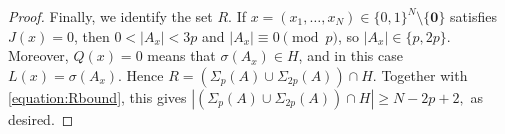 \documentclass[10pt,a4paper]{amsart}
\begin{document}
\begin{proof}
Finally, we identify the set $R$.  If
$x=(x_1,\ldots,x_N)\in\{0,1\}^N\setminus\{\mathbf 0\}$ satisfies $J(x)=0$, then
$0<|A_x|<3p$ and $|A_x|\equiv0\pmod p$, so
$|A_x|\in\{p,2p\}$. Moreover, $Q(x)=0$ means that
$\sigma(A_x)\in H$, and in this case
$L(x)=\sigma(A_x)$. Hence $R=
\left(\Sigma_p(A)\cup\Sigma_{2p}(A)\right)\cap H.$
Together with \eqref{equation:Rbound}, this gives $\left|
\left(\Sigma_p(A)\cup\Sigma_{2p}(A)\right)\cap H
\right|
\ge N-2p+2,$
as desired.
\end{proof}
\end{document}
